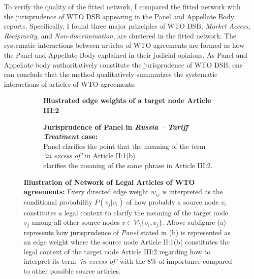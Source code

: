 To verify the quality of the fitted network, I compared the fitted network with the jurisprudence of WTO DSB appearing in the Panel and Appellate Body reports.
Specifically, I found three major principles of WTO DSB, \textit{Market Access}, \textit{Reciprocity}, and \textit{Non-discrimination}, are clustered in the fitted network.
The systematic interactions between articles of WTO agreements are formed as how the Panel and Appellate Body explained in their judicial opinions.
As Panel and Appellate body authoritatively constitute the jurisprudence of WTO DSB, one can conclude that the method qualitatively summarizes the systematic interactions of articles of WTO agreements.
 
\begin{figure}[t!]
  \captionsetup[subfigure]{justification=centering}
  \begin{subfigure}[b]{1\textwidth}
      \centering{
          
      }
      \caption{\textbf{Illustrated edge weights of a target node Article III:2}}
      \label{subfig:a:art2b}
  \end{subfigure}
  \vfill
  \begin{subfigure}[b]{1\textwidth}
      \centering{
          
      }
      \centering
      \caption{\textbf{Jurisprudence of Panel in \textit{Russia – Tariff Treatment} case:} \\ Panel clarifies the point that the meaning of the term \textit{`in excess of'} in Article II:1(b) \\ clarifies the meaning of the same phrase in Article III:2.}
      \label{subfig:a:condprob}
  \end{subfigure}
  \caption{\textbf{Illustration of Network of Legal Articles of WTO agreements: }Every directed edge weight $w_{ij}$ is interpreted as the conditional probability $P(v_j|v_i)$ of how probably a source node $v_i$ constitutes a legal context to clarify the meaning of the target node $v_j$ among all other source nodes $v\in V \setminus \{v_i, v_{j}\}$. Above subfigure (a) represents how jurisprudence of \textit{Panel} stated in (b) is represented as an edge weight where the source node Article II:1(b) constitutes the legal context of the target node Article III:2 regarding how to interpret its term \textit{`in excess of'} with the $8\%$ of importance compared to other possible source articles.}
  \label{fig:def-example}
\end{figure}

